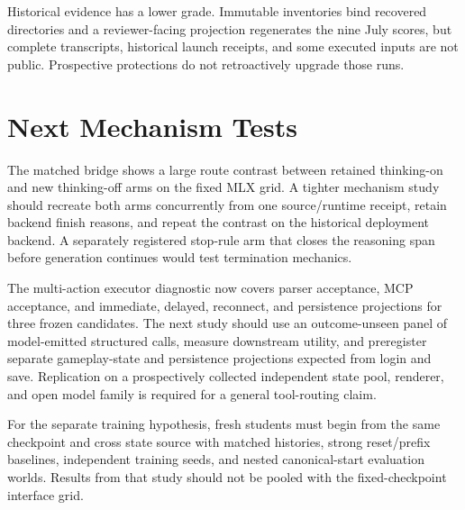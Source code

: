 \documentclass[10pt]{article}
\begin{document}
Historical evidence has a lower grade. Immutable inventories bind recovered
directories and a reviewer-facing projection regenerates the nine July scores,
but complete transcripts, historical launch receipts, and some executed inputs
are not public. Prospective protections do not retroactively upgrade those
runs.

\section{Next Mechanism Tests}

The matched bridge shows a large route contrast between retained thinking-on
and new thinking-off arms on the fixed MLX grid. A tighter mechanism study
should recreate both arms concurrently from one source/runtime receipt, retain
backend finish reasons, and repeat the contrast on the historical deployment
backend. A separately registered stop-rule arm that closes the reasoning span
before generation continues would test termination mechanics.

The multi-action executor diagnostic now covers parser acceptance, MCP
acceptance, and immediate, delayed, reconnect, and persistence projections for
three frozen candidates. The next study should use an outcome-unseen panel of
model-emitted structured calls, measure downstream utility, and preregister separate
gameplay-state and persistence projections expected from login and save.
Replication on a prospectively collected independent state pool, renderer, and
open model family is required for a general tool-routing claim.

For the separate training hypothesis, fresh students must begin from the same
checkpoint and cross state source with matched histories, strong reset/prefix
baselines, independent training seeds, and nested canonical-start evaluation
worlds. Results from that study should not be pooled with the fixed-checkpoint
interface grid.
\end{document}

